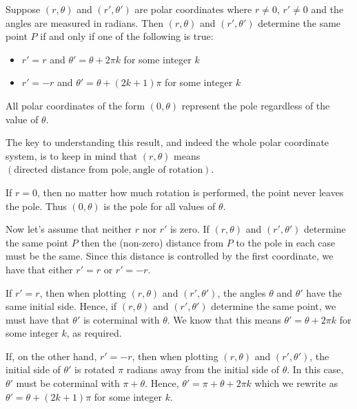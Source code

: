 \documentclass{ximera}
\begin{document}
Suppose $\left(r, \theta\right)$ and $\left(r', \theta'\right)$ are polar coordinates where $r \neq 0$, $r' \neq 0$ and the angles are measured in radians.  Then $\left(r, \theta\right)$ and $\left(r', \theta'\right)$  determine the same point $P$ if and only if one of the following is true:
 
 \begin{itemize}
 
 \item  $r' = r$ and $\theta' =  \theta + 2\pi k$ for some integer $k$
 
 \item  $r' = -r$ and $\theta' =  \theta + (2k + 1) \pi$ for some integer $k$
 
 \end{itemize}

All polar coordinates of the form $(0, \theta)$ represent the pole regardless of the value of $\theta$.


 

The key to understanding this result, and indeed the whole polar coordinate system, is to keep in mind that  $(r,\theta)$ means $(\text{directed distance from pole}, \text{angle of rotation})$. 

 

 If $r = 0$, then no matter how much rotation is performed, the point never leaves the pole.  Thus $(0, \theta)$ is the pole for all values of $\theta$.  
 
  
 
 Now let's assume that neither $r$ nor $r'$ is zero.  If $\left(r, \theta\right)$ and $\left(r', \theta'\right)$ determine the same point $P$ then the (non-zero) distance from $P$ to the pole in each case must be the same.  Since this distance is controlled by the first coordinate, we have that either $r' = r$ or $r' = -r$.  
 
  
 
 If $r' = r$, then when plotting $\left(r, \theta\right)$ and $\left(r', \theta'\right)$, the angles $ \theta$ and $ \theta'$ have the same initial side.  Hence, if $\left(r, \theta\right)$ and $\left(r', \theta'\right)$ determine the same point,   we must have that $\theta'$  is coterminal with  $\theta$.  We know that this means $\theta' = \theta + 2\pi k$ for some integer $k$, as required. 
 
  
 
  If, on the other hand, $r' = -r$, then when plotting $\left(r, \theta\right)$ and $\left(r', \theta'\right)$, the initial side of $ \theta'$ is rotated $\pi$ radians away from the initial side of $\theta$.  In this case, $ \theta'$ must be coterminal with $\pi +  \theta$.  Hence, $ \theta' = \pi +  \theta + 2\pi k$ which we rewrite as $\theta' =  \theta + (2k+1)\pi$ for some integer $k$. 
  
\end{document}

